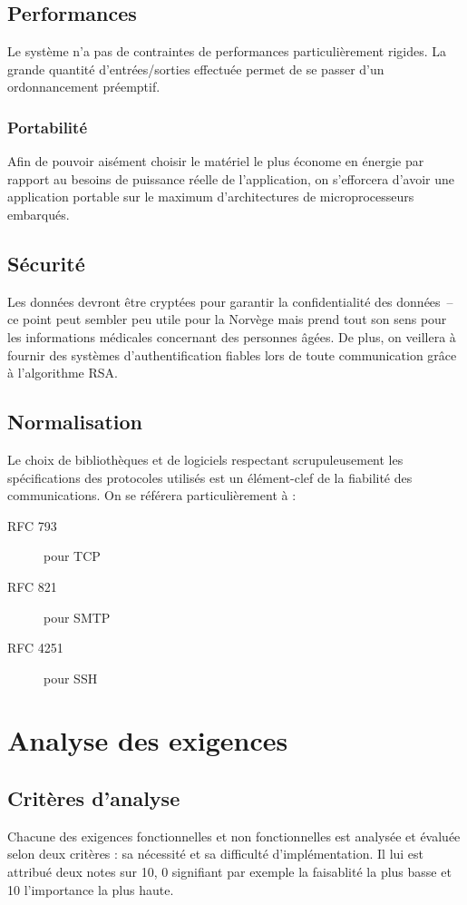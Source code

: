 \documentclass[a4paper, 11pt, final]{article}
\begin{document}
\subsection{Performances}
Le système n'a pas de contraintes de performances particulièrement rigides. La grande quantité d'entrées/sorties effectuée permet de se passer d'un ordonnancement préemptif.

\subsubsection{Portabilité}
Afin de pouvoir aisément choisir le matériel le plus économe en énergie par rapport au besoins de puissance réelle de l'application, on s'efforcera d'avoir une application portable sur le maximum d'architectures de microprocesseurs embarqués.
	
\subsection{Sécurité}
Les données devront être cryptées pour garantir la confidentialité des données~-- ce point peut sembler peu utile pour la Norvège mais prend tout son sens pour les informations médicales concernant des personnes âgées. De plus, on veillera à fournir des systèmes d'authentification fiables lors de toute communication grâce à l'algorithme RSA.
\subsection{Normalisation}

Le choix de bibliothèques et de logiciels respectant scrupuleusement les spécifications des protocoles utilisés est un élément-clef de la fiabilité des communications. On se référera particulièrement à :
\begin{description}
\item[RFC 793] pour TCP
\item[RFC 821] pour SMTP
\item[RFC 4251] pour SSH
\end{description}

\section{Analyse des exigences}

\subsection{Critères d'analyse}
Chacune des exigences fonctionnelles et non fonctionnelles est analysée et évaluée selon deux critères : sa nécessité et sa difficulté d'implémentation. Il lui est attribué deux notes sur 10, 0 signifiant par exemple la faisablité la plus basse et 10 l'importance la plus haute.
\end{document}
